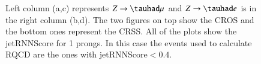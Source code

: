 \begin{figure}[htbp]
	\centering
	\hfill
	\caption{Left column (a,c) represents $Z\to\tauhad\mu$ and $Z\to\tauhad e$ is in the right column (b,d). The two figures on top show the CROS and the bottom ones represent the CRSS. All of the plots show the jetRNNScore for 1 prongs. In this case the events used to calculate RQCD are the ones with jetRNNScore$<0.4$.  }
	\label{Fig12}
\end{figure}

